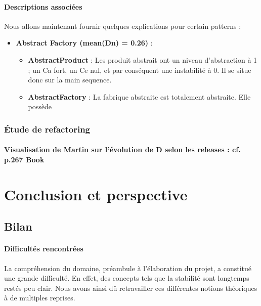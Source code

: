 \documentclass{scrartcl}
\begin{document}
    \paragraph{Descriptions associées}Nous allons maintenant fournir quelques explications pour certain patterns :
    \begin{itemize}
        \item \textbf{Abstract Factory (mean(Dn) = 0.26)} : 
        \begin{itemize}
            \item \textbf{AbstractProduct} : Les produit abstrait ont un niveau d'abstraction à 1 ; un Ca fort, un Ce nul, et par conséquent une instabilité à 0. Il se situe donc sur la main sequence.
            \item \textbf{AbstractFactory} : La fabrique abstraite est totalement abstraite. Elle possède 
        \end{itemize}
    \end{itemize}
    
    
    \subsubsection{Étude de refactoring}

    \paragraph{Visualisation de Martin sur l'évolution de D selon les releases : cf. p.267 Book}

    
    





\newpage
\section{Conclusion et perspective}
\subsection{Bilan}

    \paragraph{Difficultés rencontrées}La compréhension du domaine, préambule à l'élaboration du projet, a constitué une grande difficulté. En effet, des concepts tels que la stabilité sont longtemps restés peu clair. Nous avons ainsi dû retravailler ces différentes notions théoriques à de multiples reprises. 
    
\end{document}
